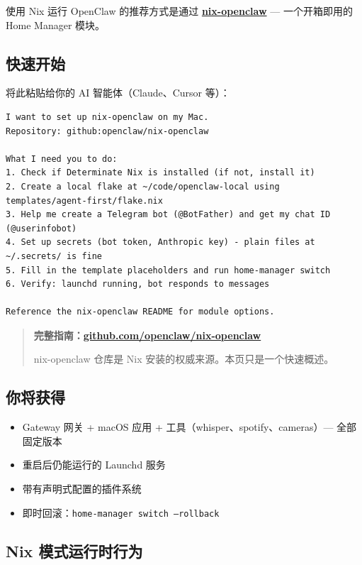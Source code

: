 使用 Nix 运行 OpenClaw 的推荐方式是通过 \textbf{\href{https://github.com/openclaw/nix-openclaw}{nix-openclaw}} — 一个开箱即用的 Home Manager 模块。

\subsection{快速开始}


将此粘贴给你的 AI 智能体（Claude、Cursor 等）：

\begin{lstlisting}
I want to set up nix-openclaw on my Mac.
Repository: github:openclaw/nix-openclaw

What I need you to do:
1. Check if Determinate Nix is installed (if not, install it)
2. Create a local flake at ~/code/openclaw-local using templates/agent-first/flake.nix
3. Help me create a Telegram bot (@BotFather) and get my chat ID (@userinfobot)
4. Set up secrets (bot token, Anthropic key) - plain files at ~/.secrets/ is fine
5. Fill in the template placeholders and run home-manager switch
6. Verify: launchd running, bot responds to messages

Reference the nix-openclaw README for module options.
\end{lstlisting}


\begin{quote}
\textbf{ 完整指南：\href{https://github.com/openclaw/nix-openclaw}{github.com/openclaw/nix-openclaw}}

nix-openclaw 仓库是 Nix 安装的权威来源。本页只是一个快速概述。
\end{quote}


\subsection{你将获得}


\begin{itemize}
  \item Gateway 网关 + macOS 应用 + 工具（whisper、spotify、cameras）— 全部固定版本
  \item 重启后仍能运行的 Launchd 服务
  \item 带有声明式配置的插件系统
  \item 即时回滚：\texttt{home-manager switch --rollback}
\end{itemize}


\hrulefill


\subsection{Nix 模式运行时行为}


